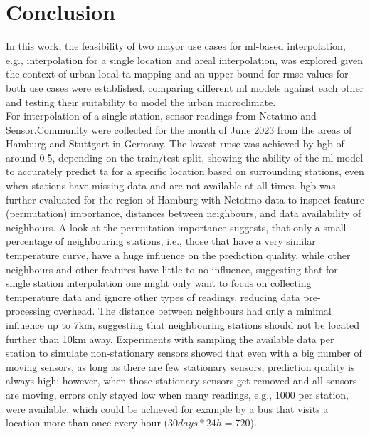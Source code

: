 \chapter{Conclusion}
\label{chap:Conclusion}

In this work, the feasibility of two mayor use cases for \gls{ml}-based interpolation, e.g., interpolation for a single location and areal interpolation, was explored given the context of urban local \gls{ta} mapping and an upper bound for \gls{rmse} values for both use cases were established, comparing different \gls{ml} models against each other and testing their suitability to model the urban microclimate.\\
For interpolation of a single station, sensor readings from Netatmo and Sensor.Community were collected for the month of June 2023 from the areas of Hamburg and Stuttgart in Germany. The lowest \gls{rmse} was achieved by \gls{hgb} of around 0.5, depending on the train/test split, showing the ability of the \gls{ml} model to accurately predict \gls{ta} for a specific location based on surrounding stations, even when stations have missing data and are not available at all times. \gls{hgb} was further evaluated for the region of Hamburg with Netatmo data to inspect feature (permutation) importance, distances between neighbours, and data availability of neighbours. A look at the permutation importance suggests, that only a small percentage of neighbouring stations, i.e., those that have a very similar temperature curve, have a huge influence on the prediction quality, while other neighbours and other features have little to no influence, suggesting that for single station interpolation one might only want to focus on collecting temperature data and ignore other types of readings, reducing data pre-processing overhead. The distance between neighbours had only a minimal influence up to 7km, suggesting that neighbouring stations should not be located further than 10km away. Experiments with sampling the available data per station to simulate non-stationary sensors showed that even with a big number of moving sensors, as long as there are few stationary sensors, prediction quality is always high; however, when those stationary sensors get removed and all sensors are moving, errors only stayed low when many readings, e.g., 1000 per station, were available, which could be achieved for example by a bus that visits a location more than once every hour ($30 days * 24h = 720$). \\
